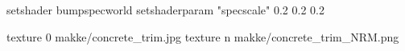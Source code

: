 setshader bumpspecworld
setshaderparam "specscale" 0.2 0.2 0.2

texture 0 makke/concrete_trim.jpg
texture n makke/concrete_trim_NRM.png
